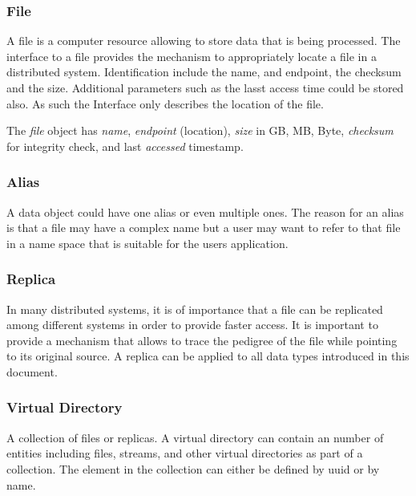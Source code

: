 \documentclass[10pt]{article}
\begin{document}
\subsubsection{File}

A file is a computer resource allowing to store data that is being
processed. The interface to a file provides the mechanism to
appropriately locate a file in a distributed system. Identification
include the name, and endpoint, the checksum and the size. Additional
parameters such as the lasst access time could be stored also. As such
the Interface only describes the location of the file.

The \textit{file} object has \textit{name}, \textit{endpoint}
(location), \textit{size} in GB, MB, Byte, \textit{checksum} for
integrity check, and last \textit{accessed} timestamp.


\subsubsection{Alias}

A data object could have one alias or even multiple ones. The reason for an
alias is that a file may have a complex name but a user may want to
refer to that file in a name space that is suitable for the users
application.


\subsubsection{Replica}

In many distributed systems, it is of importance that a file can be
replicated among different systems in order to provide faster access.
It is important to provide a mechanism that allows to trace the
pedigree of the file while pointing to its original source. A replica
can be applied to all data types introduced in this document.



\subsubsection{Virtual Directory}

A collection of files or replicas. A virtual directory can contain an
number of entities including files, streams, and other virtual
directories as part of a collection. The element in the collection can
either be defined by uuid or by name. 
\end{document}
